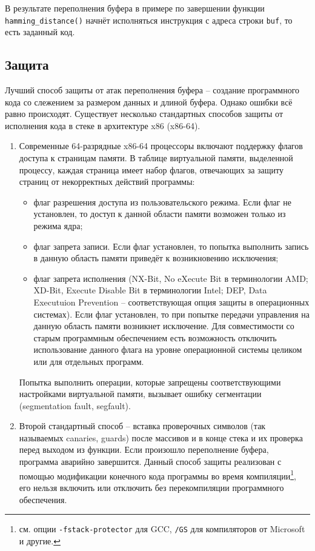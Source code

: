 В результате переполнения буфера в примере по завершении функции \texttt{hamming\_distance()} начнёт исполняться инструкция с адреса строки \texttt{buf}, то есть заданный код.


\subsection{Защита}

Лучший способ защиты от атак переполнения буфера -- создание программного кода со слежением за размером данных и длиной буфера. Однако ошибки всё равно происходят. Существует несколько стандартных способов защиты от исполнения кода в стеке в архитектуре x86 (x86-64).

\begin{enumerate}
	\item Современные 64-разрядные x86-64 процессоры включают поддержку флагов доступа к страницам памяти. В таблице виртуальной памяти, выделенной процессу, каждая страница имеет набор флагов, отвечающих за защиту страниц от некорректных действий программы:
	\begin{itemize}
		\item флаг разрешения доступа из пользовательского режима. Если флаг не установлен, то доступ к данной области памяти возможен только из режима ядра;
		\item флаг запрета записи. Если флаг установлен, то попытка выполнить запись в данную область памяти приведёт к возникновению исключения;
		\item флаг запрета исполнения (NX-Bit, No eXecute Bit в терминологии AMD; XD-Bit, Execute Disable Bit в терминологии Intel; DEP, Data Executuion Prevention -- соответствующая опция защиты в операционных системах). Если флаг установлен, то при попытке передачи управления на данную область памяти возникнет исключение. Для совместимости со старым программным обеспечением есть возможность отключить использование данного флага на уровне операционной системы целиком или для отдельных программ.
	\end{itemize}
	Попытка выполнить операции, которые запрещены соответствующими настройками виртуальной памяти, вызывает ошибку сегментации (segmentation fault, segfault).

    \item Второй стандартный способ -- вставка проверочных символов (так называемых canaries, guards) после массивов и в конце стека и их проверка перед выходом из функции. Если произошло переполнение буфера, программа аварийно завершится. Данный способ защиты реализован с помощью модификации конечного кода программы во время компиляции\footnote{см. опции \texttt{-fstack-protector} для GCC, \texttt{/GS} для компиляторов от Microsoft и другие.}, его нельзя включить или отключить без перекомпиляции программного обеспечения.


\end{enumerate}
